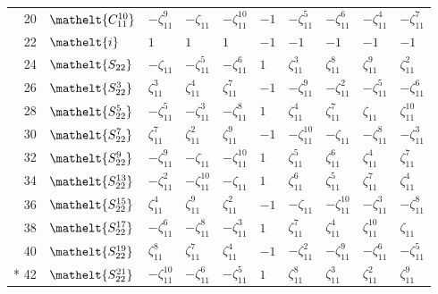 \documentclass[10pt,a4paper]{article}
\numberwithin{equation}{section}
\newcommand{\eltfont}[1]{{\let\sigma\eltsigma\mathelt{#1}}}
\newcommand{\cls}[1]{\eltfont{#1}}
\newcommand{\rootunity}[1]{\zeta_{#1}}
\begin{document}
{\begin{longtable}{@{}rlllllllll@{}}
20 & $\cls{C_{11}^{10}}$ & $-\rootunity{11}^{9}$ & $-\rootunity{11}$ & $-\rootunity{11}^{10}$ & $-1$ & $-\rootunity{11}^{5}$ & $-\rootunity{11}^{6}$ & $-\rootunity{11}^{4}$ & $-\rootunity{11}^{7}$\\
22 & $\cls{i}$ & $1$ & $1$ & $1$ & $-1$ & $-1$ & $-1$ & $-1$ & $-1$\\
24 & $\cls{S_{22}}$ & $-\rootunity{11}$ & $-\rootunity{11}^{5}$ & $-\rootunity{11}^{6}$ & $1$ & $\rootunity{11}^{3}$ & $\rootunity{11}^{8}$ & $\rootunity{11}^{9}$ & $\rootunity{11}^{2}$\\
26 & $\cls{S_{22}^{3}}$ & $\rootunity{11}^{3}$ & $\rootunity{11}^{4}$ & $\rootunity{11}^{7}$ & $-1$ & $-\rootunity{11}^{9}$ & $-\rootunity{11}^{2}$ & $-\rootunity{11}^{5}$ & $-\rootunity{11}^{6}$\\
28 & $\cls{S_{22}^{5}}$ & $-\rootunity{11}^{5}$ & $-\rootunity{11}^{3}$ & $-\rootunity{11}^{8}$ & $1$ & $\rootunity{11}^{4}$ & $\rootunity{11}^{7}$ & $\rootunity{11}$ & $\rootunity{11}^{10}$\\
30 & $\cls{S_{22}^{7}}$ & $\rootunity{11}^{7}$ & $\rootunity{11}^{2}$ & $\rootunity{11}^{9}$ & $-1$ & $-\rootunity{11}^{10}$ & $-\rootunity{11}$ & $-\rootunity{11}^{8}$ & $-\rootunity{11}^{3}$\\
32 & $\cls{S_{22}^{9}}$ & $-\rootunity{11}^{9}$ & $-\rootunity{11}$ & $-\rootunity{11}^{10}$ & $1$ & $\rootunity{11}^{5}$ & $\rootunity{11}^{6}$ & $\rootunity{11}^{4}$ & $\rootunity{11}^{7}$\\
34 & $\cls{S_{22}^{13}}$ & $-\rootunity{11}^{2}$ & $-\rootunity{11}^{10}$ & $-\rootunity{11}$ & $1$ & $\rootunity{11}^{6}$ & $\rootunity{11}^{5}$ & $\rootunity{11}^{7}$ & $\rootunity{11}^{4}$\\
36 & $\cls{S_{22}^{15}}$ & $\rootunity{11}^{4}$ & $\rootunity{11}^{9}$ & $\rootunity{11}^{2}$ & $-1$ & $-\rootunity{11}$ & $-\rootunity{11}^{10}$ & $-\rootunity{11}^{3}$ & $-\rootunity{11}^{8}$\\
38 & $\cls{S_{22}^{17}}$ & $-\rootunity{11}^{6}$ & $-\rootunity{11}^{8}$ & $-\rootunity{11}^{3}$ & $1$ & $\rootunity{11}^{7}$ & $\rootunity{11}^{4}$ & $\rootunity{11}^{10}$ & $\rootunity{11}$\\
40 & $\cls{S_{22}^{19}}$ & $\rootunity{11}^{8}$ & $\rootunity{11}^{7}$ & $\rootunity{11}^{4}$ & $-1$ & $-\rootunity{11}^{2}$ & $-\rootunity{11}^{9}$ & $-\rootunity{11}^{6}$ & $-\rootunity{11}^{5}$\\*
42 & $\cls{S_{22}^{21}}$ & $-\rootunity{11}^{10}$ & $-\rootunity{11}^{6}$ & $-\rootunity{11}^{5}$ & $1$ & $\rootunity{11}^{8}$ & $\rootunity{11}^{3}$ & $\rootunity{11}^{2}$ & $\rootunity{11}^{9}$\\
\bottomrule\end{longtable}}
\end{document}

